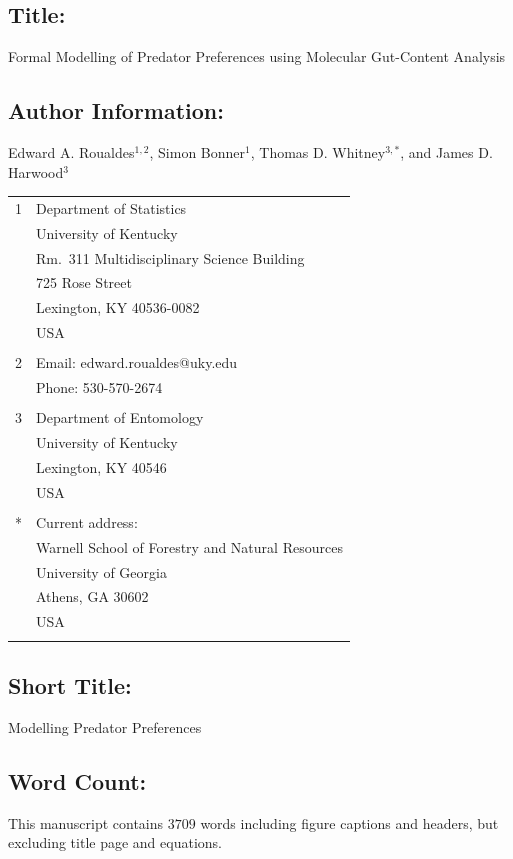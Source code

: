 \documentclass[12pt]{article}
\begin{document}
\subsection*{Title:}  Formal Modelling of Predator Preferences using Molecular Gut-Content Analysis

\subsection*{Author Information:}
Edward A. Roualdes$^{1,2}$, Simon Bonner$^1$, Thomas D. Whitney$^{3,*}$, and James D. Harwood$^3$
 
\begin{tabular}{ll}
  1 & Department of Statistics\\
  & University of Kentucky\\
  & Rm.~311 Multidisciplinary Science Building\\
  & 725 Rose Street\\
  & Lexington, KY 40536-0082\\
  & USA\\
  \\
  2 & Email: edward.roualdes@uky.edu\\
  & Phone: 530-570-2674\\
  \\
  3 & Department of Entomology\\
  & University of Kentucky \\
  & Lexington, KY 40546\\
  & USA \\
  \\
  * & Current address: \\
  & Warnell School of Forestry and Natural Resources \\
  & University of Georgia \\
  & Athens, GA 30602\\
  & USA \\
  \\

\end{tabular}

\subsection*{Short Title:}
Modelling Predator Preferences

\subsection*{Word Count:}
This manuscript contains $3709$ words including figure captions and headers, but excluding title page and equations. 
\end{document}
